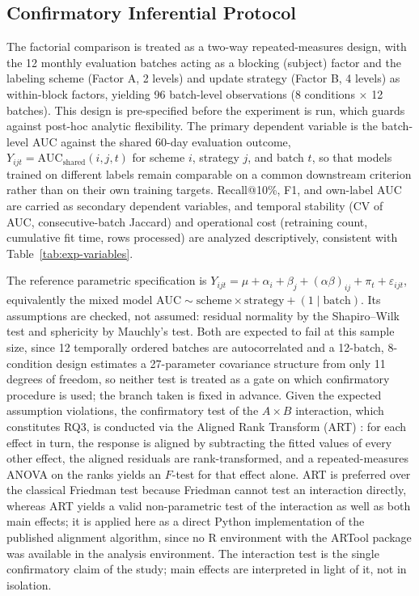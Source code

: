 \subsection{Confirmatory Inferential Protocol}
\label{sec:confirmatory-protocol}

The factorial comparison is treated as a two-way repeated-measures design, with the 12 monthly evaluation batches acting as a blocking (subject) factor and the labeling scheme (Factor A, 2 levels) and update strategy (Factor B, 4 levels) as within-block factors, yielding 96 batch-level observations (8 conditions $\times$ 12 batches). This design is pre-specified before the experiment is run, which guards against post-hoc analytic flexibility. The primary dependent variable is the batch-level AUC against the shared 60-day evaluation outcome, $Y_{ijt} = \text{AUC}_{\text{shared}}(i,j,t)$ for scheme $i$, strategy $j$, and batch $t$, so that models trained on different labels remain comparable on a common downstream criterion rather than on their own training targets. Recall@10\%, F1, and own-label AUC are carried as secondary dependent variables, and temporal stability (CV of AUC, consecutive-batch Jaccard) and operational cost (retraining count, cumulative fit time, rows processed) are analyzed descriptively, consistent with Table~\ref{tab:exp-variables}.

The reference parametric specification is $Y_{ijt} = \mu + \alpha_i + \beta_j + (\alpha\beta)_{ij} + \pi_t + \varepsilon_{ijt}$, equivalently the mixed model $\text{AUC} \sim \text{scheme} \times \text{strategy} + (1 \mid \text{batch})$. Its assumptions are checked, not assumed: residual normality by the Shapiro--Wilk test and sphericity by Mauchly's test. Both are expected to fail at this sample size, since 12 temporally ordered batches are autocorrelated and a 12-batch, 8-condition design estimates a 27-parameter covariance structure from only 11 degrees of freedom, so neither test is treated as a gate on which confirmatory procedure is used; the branch taken is fixed in advance. Given the expected assumption violations, the confirmatory test of the $A \times B$ interaction, which constitutes RQ3, is conducted via the Aligned Rank Transform (ART) \citep{wobbrock2011art}: for each effect in turn, the response is aligned by subtracting the fitted values of every other effect, the aligned residuals are rank-transformed, and a repeated-measures ANOVA on the ranks yields an $F$-test for that effect alone. ART is preferred over the classical Friedman test because Friedman cannot test an interaction directly, whereas ART yields a valid non-parametric test of the interaction as well as both main effects; it is applied here as a direct Python implementation of the published alignment algorithm, since no R environment with the ARTool package was available in the analysis environment. The interaction test is the single confirmatory claim of the study; main effects are interpreted in light of it, not in isolation.

